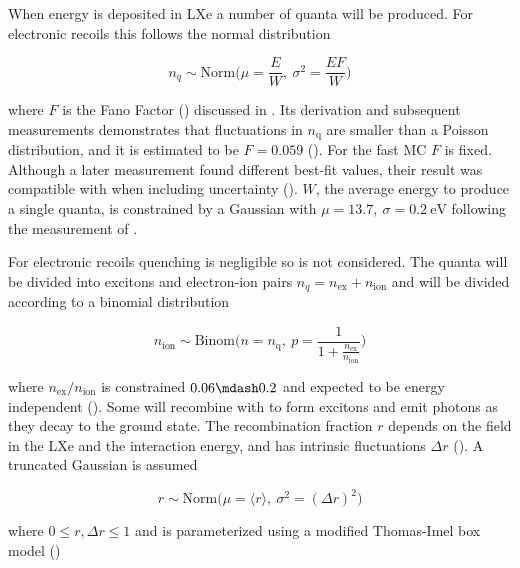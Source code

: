 When energy is deposited in LXe a number of quanta will be produced.  For electronic recoils this follows the normal distribution

\begin{equation}
n_q \sim \mathrm{Norm} \bigg( \mu = \frac{E}{W},\ \sigma^2 = \frac{E F}{W} \bigg)
\label{eq:er_nr_calibrations_parameter_determ_er_quanta}
\end{equation}

\noindent where $F$ is the Fano Factor () discussed in .  Its derivation and subsequent measurements
demonstrates
that fluctuations in $n_{\mathrm{q}}$ are smaller than a Poisson distribution, and it is estimated to be $F = 0.059$
().  For the
fast MC $F$ is fixed.  Although a later measurement found different best-fit values, their result was
compatible with  when including uncertainty ().  $W$, the average energy to produce a single
quanta, is constrained by a Gaussian with $\mu = 13.7,\ \sigma = 0.2\ \mathrm{eV}$ following the measurement of .

For electronic recoils quenching is negligible so is not considered.  The quanta will be divided into excitons and electron-ion pairs
$n_q = n_{\mathrm{ex}} + n_{\mathrm{ion}}$ and will be divided according to a binomial distribution

\begin{equation}
n_{\mathrm{ion}} \sim \mathrm{Binom} \Bigg(n = n_{\mathrm{q}},\ p = \frac{1}{1 + \frac{n_{\mathrm{ex}}}{n_{\mathrm{ion}}}} \Bigg)
\label{eq:er_nr_calibrations_parameter_determ_er_nions}
\end{equation}

\noindent where $n_{\mathrm{ex}} / n_{\mathrm{ion}}$ is constrained $0.06 \mdash 0.2$ and expected to be energy independent
().  Some \electron will recombine with  to form
excitons and emit photons as they decay to the ground state.  The recombination fraction $r$ depends on the field in the LXe and the
interaction energy, and has intrinsic fluctuations $\Delta r$ ().  A truncated Gaussian is assumed

\begin{equation}
r \sim \mathrm{Norm} \Big( \mu = \langle r \rangle,\ \sigma^2 = (\Delta r)^2 \Big)
\end{equation}

\noindent where $0 \leq r, \Delta r \leq 1$ and is parameterized using a modified Thomas-Imel box model ()

